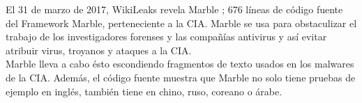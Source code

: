 El 31 de marzo de 2017, WikiLeaks revela Marble \cite{marble-framework}; 676 líneas de código fuente del Framework Marble, perteneciente a la CIA. Marble se usa para obstaculizar el trabajo de los investigadores forenses y las compañías antivirus y así evitar atribuir virus, troyanos y ataques a la CIA. \\

Marble lleva a cabo ésto escondiendo fragmentos de texto usados en los malwares de la CIA. Además, el código fuente muestra que Marble no solo tiene pruebas de ejemplo en inglés, también tiene en chino, ruso, coreano o árabe. 


